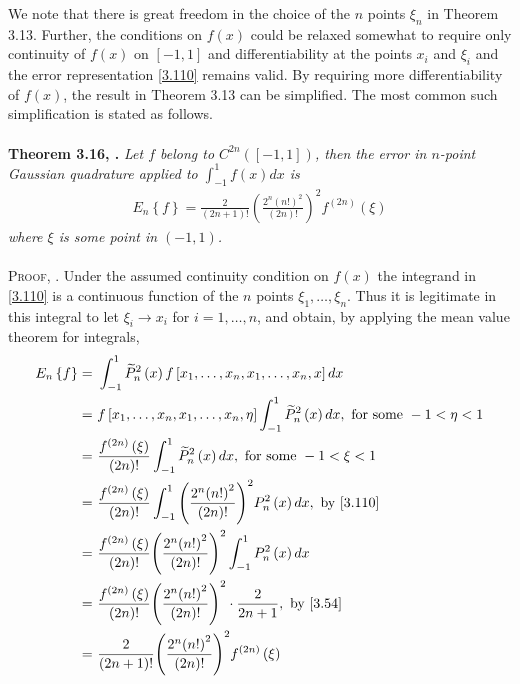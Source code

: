 \documentclass[a4paper]{article}
\numberwithin{equation}{section}
\begin{document}
We note that there is great freedom in the choice of the $n$ points $\xi _n$ in Theorem 3.13. Further, the conditions on $f\left(x\right)$ could be relaxed somewhat to require only continuity of $f\left(x\right)$ on $\left[-1,1\right]$ and differentiability at the points $x_i$ and $\xi _i$ and the error representation \eqref{3.110} remains valid. By requiring more differentiability of $f\left(x\right)$, the result in Theorem 3.13 can be simplified. The most common such simplification is stated as follows.\\
\\
\textbf{Theorem 3.16, \cite{6}.} \textit{Let $f$ belong to ${C^{2n}}\left( {\left[ { - 1,1} \right]} \right)$, then the error in $n$-point Gaussian quadrature applied to $\int_{ - 1}^1 {f\left( x \right)dx} $ is}
\begin{align}
\label{3.124}
{E_n}\left\{ f \right\} = \frac{2}{{\left( {2n + 1} \right)!}}{\left( {\frac{{{2^n}{{\left( {n!} \right)}^2}}}{{\left( {2n} \right)!}}} \right)^2}{f^{\left( {2n} \right)}}\left( \xi  \right)
\end{align}
\textit{where $\xi$ is some point in $\left(-1,1\right)$.}\\
\\
\textsc{Proof, \cite{6}.} Under the assumed continuity condition on $f\left(x\right)$ the integrand in \eqref{3.110} is a continuous function of the $n$ points $\xi _1,\ldots,\xi _n$. Thus it is legitimate in this integral to let $\xi _i\to x_i$ for $i=1,\ldots,n$, and obtain, by applying the mean value theorem for integrals,
\begin{align}
{E_n}\left\{ f \right\} =&\ \int_{ - 1}^1 {\widetilde P_n^2\left( x \right)f\left[ {{x_1}, \ldots ,{x_n},{x_1}, \ldots ,{x_n},x} \right]dx} \\
=&\ f\left[ {{x_1}, \ldots ,{x_n},{x_1}, \ldots ,{x_n},\eta } \right]\int_{ - 1}^1 {\widetilde P_n^2\left( x \right)dx}, \mbox{ for some }- 1 < \eta  < 1\\
=&\ \frac{{{f^{\left( {2n} \right)}}\left( \xi  \right)}}{{\left( {2n} \right)!}}\int_{ - 1}^1 {\widetilde P_n^2\left( x \right)dx} ,\mbox{ for some } - 1 < \xi  < 1\\
=&\ \frac{{{f^{\left( {2n} \right)}}\left( \xi  \right)}}{{\left( {2n} \right)!}}\int_{ - 1}^1 {{{\left( {\frac{{{2^n}{{\left( {n!} \right)}^2}}}{{\left( {2n} \right)!}}} \right)}^2}P_n^2\left( x \right)dx} ,\mbox{ by \eqref{3.110}}\\
=&\ \frac{{{f^{\left( {2n} \right)}}\left( \xi  \right)}}{{\left( {2n} \right)!}}{\left( {\frac{{{2^n}{{\left( {n!} \right)}^2}}}{{\left( {2n} \right)!}}} \right)^2}\int_{ - 1}^1 {P_n^2\left( x \right)dx} \\
=&\ \frac{{{f^{\left( {2n} \right)}}\left( \xi  \right)}}{{\left( {2n} \right)!}}{\left( {\frac{{{2^n}{{\left( {n!} \right)}^2}}}{{\left( {2n} \right)!}}} \right)^2} \cdot \frac{2}{{2n + 1}},\mbox{ by \eqref{3.54}}\\
=&\ \frac{2}{{\left( {2n + 1} \right)!}}{\left( {\frac{{{2^n}{{\left( {n!} \right)}^2}}}{{\left( {2n} \right)!}}} \right)^2}{f^{\left( {2n} \right)}}\left( \xi  \right)
\end{align}
\end{document}
